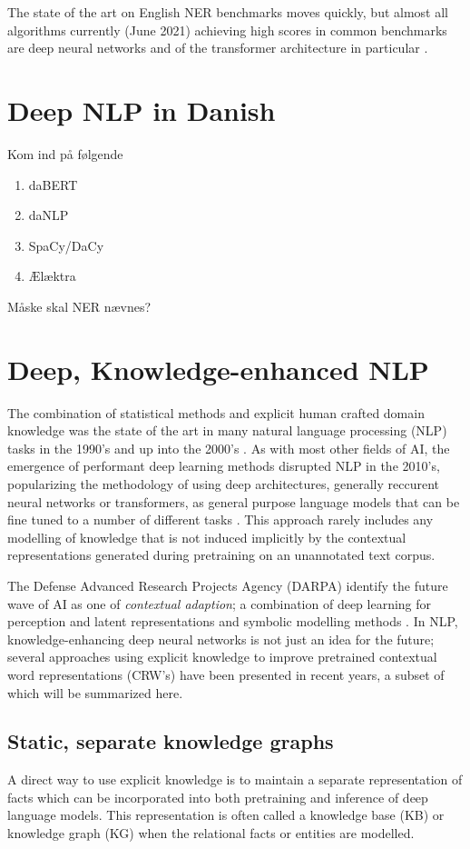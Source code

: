 \documentclass[main.tex]{subfiles}
\begin{document}
The state of the art on English NER benchmarks moves quickly, but almost all algorithms currently (June 2021) achieving high scores in common benchmarks are deep neural networks and of the transformer architecture in particular \cite{ruder21ner, pwc21ner}.

\section{Deep NLP in Danish}

Kom ind på følgende
\begin{enumerate}
    \item daBERT
    \item daNLP
    \item SpaCy/DaCy
    \item Ælæktra
\end{enumerate}

Måske skal NER nævnes?

\section{Deep, Knowledge-enhanced NLP}
The combination of statistical methods and explicit human crafted domain knowledge was the state of the art in many natural language processing (NLP) tasks in the 1990's and up into the 2000's \cite[Sec. 22.5]{russell2016ai}.
As with most other fields of AI, the emergence of performant deep learning methods disrupted NLP in the 2010's, popularizing the methodology of using deep architectures, generally reccurent neural networks or transformers, as general purpose language models that can be fine tuned to a number of different tasks \cite{otter18dlnlp}.
This approach rarely includes any modelling of knowledge that is not induced implicitly by the contextual representations generated during pretraining on an unannotated text corpus.

The Defense Advanced Research Projects Agency (DARPA) identify the future wave of AI as one of \emph{contextual adaption}; a combination of deep learning for perception and latent representations and symbolic modelling methods \cite{darpa17ai}.
In NLP, knowledge-enhancing deep neural networks is not just an idea for the future; several approaches using explicit knowledge to improve pretrained contextual word representations (CRW's) have been presented in recent years, a subset of which will be summarized here.

\subsection{Static, separate knowledge graphs}
A direct way to use explicit knowledge is to maintain a separate representation of facts which can be incorporated into both pretraining and inference of deep language models.
This representation is often called a knowledge base (KB) or knowledge graph (KG) when the relational facts or entities are modelled.
\end{document}
